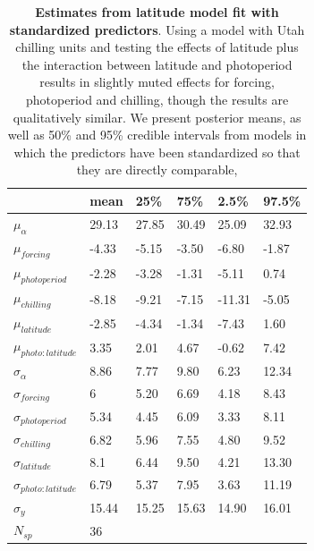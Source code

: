 \documentclass{article}
\begin{document}
\begin{footnotesize}
\begin{table}[ht]
\centering
\caption{\textbf{Estimates from latitude model fit with standardized predictors}. Using a model with Utah chilling units and testing the effects of latitude plus the interaction between latitude and photoperiod results in slightly muted effects for forcing, photoperiod and chilling, though the results are qualitatively similar. We present posterior means, as well as 50\% and 95\% credible intervals from models in which the predictors have been standardized so that they are directly comparable,} 
\label{tab:lat}
\begingroup\footnotesize
\begin{tabular}{|p{}|p{}|p{}|p{}|p{}|p{}|}
  \hline
 & mean & 25\% & 75\% & 2.5\% & 97.5\% \\ 
  \hline
$\mu_{\alpha}$ & 29.13 & 27.85 & 30.49 & 25.09 & 32.93 \\ 
  $\mu_{forcing}$ & -4.33 & -5.15 & -3.50 & -6.80 & -1.87 \\ 
  $\mu_{photoperiod}$ & -2.28 & -3.28 & -1.31 & -5.11 & 0.74 \\ 
  $\mu_{chilling}$ & -8.18 & -9.21 & -7.15 & -11.31 & -5.05 \\ 
  $\mu_{latitude}$ & -2.85 & -4.34 & -1.34 & -7.43 & 1.60 \\ 
  $\mu_{photo:latitude}$ & 3.35 & 2.01 & 4.67 & -0.62 & 7.42 \\ 
  $\sigma_{\alpha}$ & 8.86 & 7.77 & 9.80 & 6.23 & 12.34 \\ 
  $\sigma_{forcing}$ & 6 & 5.20 & 6.69 & 4.18 & 8.43 \\ 
  $\sigma_{photoperiod}$ & 5.34 & 4.45 & 6.09 & 3.33 & 8.11 \\ 
  $\sigma_{chilling}$ & 6.82 & 5.96 & 7.55 & 4.80 & 9.52 \\ 
  $\sigma_{latitude}$ & 8.1 & 6.44 & 9.50 & 4.21 & 13.30 \\ 
  $\sigma_{photo:latitude}$ & 6.79 & 5.37 & 7.95 & 3.63 & 11.19 \\ 
  $\sigma_{y}$ & 15.44 & 15.25 & 15.63 & 14.90 & 16.01 \\ 
   \hline
$N_{sp}$ & 36 &  &  &  &  \\ 
   \hline
\end{tabular}
\endgroup
\end{table}


\end{footnotesize}
\end{document}
